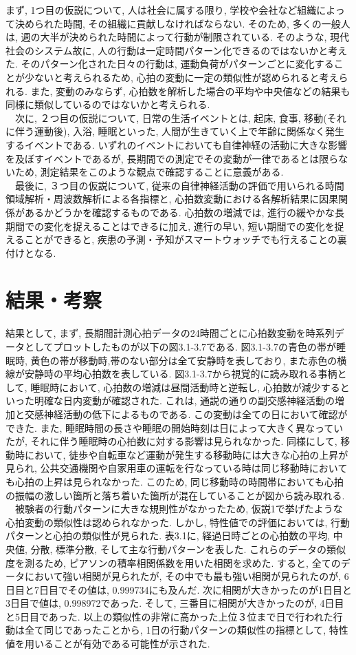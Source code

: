 \documentclass[report, 11pt, a4paper]{jsbook}
\begin{document}
まず, 1つ目の仮説について, 人は社会に属する限り, 学校や会社など組織によって決められた時間, その組織に貢献しなければならない. そのため, 多くの一般人は, 週の大半が決められた時間によって行動が制限されている. そのような, 現代社会のシステム故に, 人の行動は一定時間パターン化できるのではないかと考えた. そのパターン化された日々の行動は, 運動負荷がパターンごとに変化することが少ないと考えられるため, 心拍の変動に一定の類似性が認められると考えられる. また, 変動のみならず, 心拍数を解析した場合の平均や中央値などの結果も同様に類似しているのではないかと考えられる. \\
　次に, ２つ目の仮説について, 日常の生活イベントとは, 起床, 食事, 移動(それに伴う運動後), 入浴, 睡眠といった, 人間が生きていく上で年齢に関係なく発生するイベントである. いずれのイベントにおいても自律神経の活動に大きな影響を及ぼすイベントであるが, 長期間での測定でその変動が一律であるとは限らないため, 測定結果をこのような観点で確認することに意義がある. \\
　最後に, ３つ目の仮説について, 従来の自律神経活動の評価で用いられる時間領域解析・周波数解析による各指標と, 心拍数変動における各解析結果に因果関係があるかどうかを確認するものである. 心拍数の増減では, 進行の緩やかな長期間での変化を捉えることはできるに加え, 進行の早い, 短い期間での変化を捉えることができると, 疾患の予測・予知がスマートウォッチでも行えることの裏付けとなる. 
　
\section{結果・考察}
結果として, まず, 長期間計測心拍データの24時間ごとに心拍数変動を時系列データとしてプロットしたものが以下の図3.1-3.7である. 図3.1-3.7の青色の帯が睡眠時, 黄色の帯が移動時,帯のない部分は全て安静時を表しており, また赤色の横線が安静時の平均心拍数を表している. 図3.1-3.7から視覚的に読み取れる事柄として, 睡眠時において, 心拍数の増減は昼間活動時と逆転し, 心拍数が減少するといった明確な日内変動が確認された. これは, 通説の通りの副交感神経活動の増加と交感神経活動の低下によるものである. この変動は全ての日において確認ができた. また, 睡眠時間の長さや睡眠の開始時刻は日によって大きく異なっていたが, それに伴う睡眠時の心拍数に対する影響は見られなかった. 同様にして, 移動時において, 徒歩や自転車など運動が発生する移動時には大きな心拍の上昇が見られ, 公共交通機関や自家用車の運転を行なっている時は同じ移動時においても心拍の上昇は見られなかった. このため, 同じ移動時の時間帯においても心拍の振幅の激しい箇所と落ち着いた箇所が混在していることが図から読み取れる. \\
　被験者の行動パターンに大きな規則性がなかったため, 仮説1で挙げたような心拍変動の類似性は認められなかった. しかし, 特性値での評価においては, 行動パターンと心拍の類似性が見られた. 表3.1に, 経過日時ごとの心拍数の平均, 中央値, 分散, 標準分散, そして主な行動パターンを表した. これらのデータの類似度を測るため, ピアソンの積率相関係数を用いた相関を求めた. すると, 全てのデータにおいて強い相関が見られたが, その中でも最も強い相関が見られたのが, 6日目と7日目でその値は, 0.999734にも及んだ. 次に相関が大きかったのが1日目と3日目で値は, 0.998972であった. そして, 三番目に相関が大きかったのが, 4日目と5日目であった. 以上の類似性の非常に高かった上位３位まで日で行われた行動は全て同じであったことから, 1日の行動パターンの類似性の指標として, 特性値を用いることが有効である可能性が示された.  
 
\end{document}

